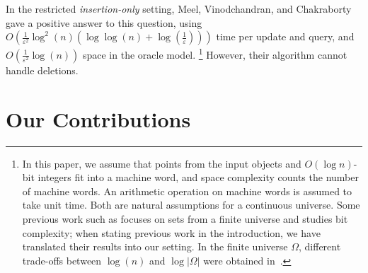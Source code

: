 \documentclass[11pt]{article}
\newcommand{\eps}{\varepsilon}
\begin{document}
%
In the restricted \emph{insertion-only} setting, Meel, Vinodchandran, and Chakraborty~\cite{MVC21} gave a positive answer to this question, using $O\left(\frac{1}{\eps^2} \log^2(n) (\log \log(n) + \log(\frac{1}{\eps})) \right)$ time per update and query, and $O\left( \frac{1}{\eps^2} \log(n) \right)$ space in the oracle model.%
\footnote{In this paper, we assume that points from the input objects and $O(\log n)$-bit integers fit into a machine word, and space complexity counts the number of machine words. An arithmetic operation on machine words is assumed to take unit time. Both are natural assumptions for a continuous universe. Some previous work such as \cite{MVC21} focuses on sets from a finite universe and studies bit complexity; when stating previous work in the introduction, we have translated their results into our setting. In the finite universe $\Omega$, different trade-offs between $\log(n)$ and $\log |\Omega|$ were obtained in~\cite{MCV22,NandiVGMP024}.}
However, their algorithm cannot handle deletions.
%
\section{Our Contributions}
%
\end{document}
